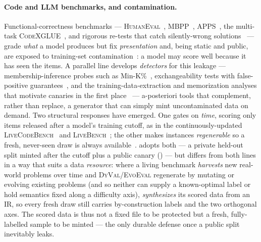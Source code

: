 \paragraph{Code and LLM benchmarks, and contamination.} Functional-correctness benchmarks
--- \textsc{HumanEval}~\citep{chen2021evaluating}, \textsc{MBPP}~\citep{austin2021program},
\textsc{APPS}~\citep{hendrycks2021apps}, the multi-task
\textsc{CodeXGLUE}~\citep{lu2021codexglue}, and rigorous re-tests that catch silently-wrong
solutions~\citep{liu2023evalplus} --- grade \emph{what} a model produces but fix
\emph{presentation} and, being static and public, are exposed to training-set
contamination~\citep{sainz2023nlp,riddell2024quantifying,jacovi2023stop}: a model may
score well because it has seen the items. A parallel line develops \emph{detectors} for
this leakage --- membership-inference probes such as Min-K\%~\citep{shi2024detecting},
exchangeability tests with false-positive guarantees~\citep{oren2024proving}, and the
training-data-extraction and memorization analyses that motivate canaries in the first
place~\citep{carlini2021extracting} --- a-posteriori tools that complement, rather than
replace, a generator that can simply mint uncontaminated data on demand. Two structural
responses have emerged. One gates
on \emph{time}, scoring only items released after a model's training cutoff, as in the
continuously-updated \textsc{LiveCodeBench}~\citep{jain2024livecodebench} and
\textsc{LiveBench}~\citep{white2024livebench}; the other makes instances
\emph{regenerable} so a fresh, never-seen draw is always
available~\citep{zhu2024dyval,xia2024evoeval}. \tool{} adopts both
--- a private held-out split minted after the cutoff plus a public canary
() --- but differs from both lines in a way that suits a data
\emph{resource}: where a living benchmark \emph{harvests} new real-world problems over
time and \textsc{DyVal}/\textsc{EvoEval} regenerate by mutating or evolving existing
problems (and so neither can supply a known-optimal label or hold semantics fixed along a
difficulty axis), \tool{} \emph{synthesizes} its scored data from an IR, so every fresh draw still
carries by-construction labels and the two orthogonal axes. The scored data is thus not a
fixed file to be protected but a fresh, fully-labelled sample to be minted --- the only
durable defense once a public split inevitably leaks.

